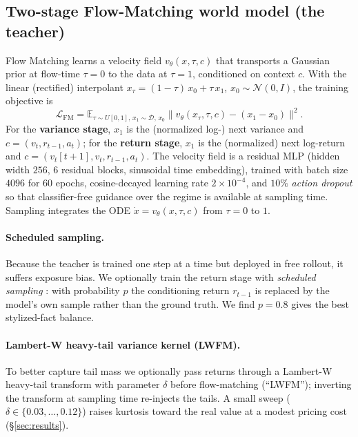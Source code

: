\documentclass[11pt]{article}
\newcommand{\vt}{v_t}
\newcommand{\E}{\mathbb{E}}
\begin{document}
\subsection{Two-stage Flow-Matching world model (the teacher)}
Flow Matching \citep{lipman2023flow} learns a velocity field $v_\theta(x,\tau,c)$
that transports a Gaussian prior at flow-time $\tau{=}0$ to the data at $\tau{=}1$,
conditioned on context $c$. With the linear (rectified) interpolant
$x_\tau=(1-\tau)\,x_0+\tau\,x_1$, $x_0\sim\mathcal N(0,I)$, the training objective is
\begin{equation}
\mathcal L_{\mathrm{FM}}
= \E_{\tau\sim U[0,1],\,x_1\sim\mathcal D,\,x_0}
\big\| v_\theta(x_\tau,\tau,c) - (x_1-x_0) \big\|^2 .
\end{equation}
For the \textbf{variance stage}, $x_1$ is the (normalized log-) next variance and
$c=(\vt, r_{t-1}, a_t)$; for the \textbf{return stage}, $x_1$ is the (normalized)
next log-return and $c=(\vt[t{+}1],\vt, r_{t-1}, a_t)$. The velocity field is a
residual MLP (hidden width $256$, $6$ residual blocks, sinusoidal time embedding),
trained with batch size $4096$ for $60$ epochs, cosine-decayed learning rate
$2\!\times\!10^{-4}$, and $10\%$ \emph{action dropout} so that classifier-free
guidance over the regime is available at sampling time. Sampling integrates the
ODE $\dot x = v_\theta(x,\tau,c)$ from $\tau{=}0$ to $1$.

\paragraph{Scheduled sampling.}
Because the teacher is trained one step at a time but deployed in free rollout, it
suffers exposure bias. We optionally train the return stage with
\emph{scheduled sampling} \citep{bengio2015scheduled}: with probability $p$ the
conditioning return $r_{t-1}$ is replaced by the model's own sample rather than the
ground truth. We find $p{=}0.8$ gives the best stylized-fact balance.

\paragraph{Lambert-W heavy-tail variance kernel (LWFM).}
To better capture tail mass we optionally pass returns through a Lambert-W
heavy-tail transform \citep{goerg2015lambert} with parameter $\delta$ before
flow-matching (``LWFM''); inverting the transform at sampling time re-injects the
tails. A small sweep ($\delta\in\{0.03,\dots,0.12\}$) raises kurtosis toward the
real value at a modest pricing cost (\S\ref{sec:results}).
\end{document}
